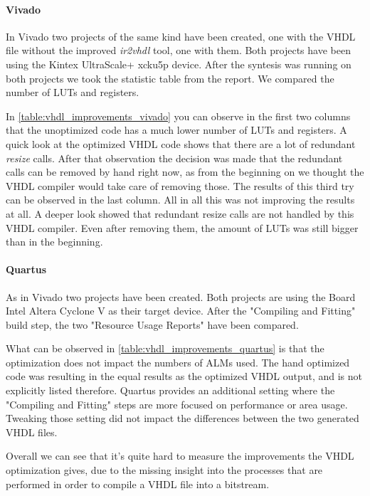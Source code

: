\paragraph{Vivado}
In Vivado two projects of the same kind have been created, one with the VHDL file without the improved \textit{ir2vhdl} tool, one with them. Both projects have been using the Kintex UltraScale+ xcku5p device. After the syntesis was running on both projects we took the statistic table from the report. We compared the number of LUTs and registers. 

In \autoref{table:vhdl_improvements_vivado} you can observe in the first two columns that the unoptimized code has a much lower number of LUTs and registers.
A quick look at the optimized VHDL code shows that there are a lot of redundant \textit{resize} calls. After that observation the decision was made that the redundant calls can be removed by hand right now, as from the beginning on we thought the VHDL compiler would take care of removing those. The results of this third try can be observed in the last column.
All in all this was not improving the results at all. A deeper look showed that redundant resize calls are not handled by this VHDL compiler. Even after removing them, the amount of LUTs was still bigger than in the beginning.

\paragraph{Quartus}
As in Vivado two projects have been created. Both projects are using the Board Intel Altera Cyclone V as their target device. After the "Compiling and Fitting" build step, the two "Resource Usage Reports" have been compared.

What can be observed in \autoref{table:vhdl_improvements_quartus} is that the optimization does not impact the numbers of ALMs used. The hand optimized code was resulting in the equal results as the optimized VHDL output, and is not explicitly listed therefore. Quartus provides an additional setting where the "Compiling and Fitting" steps are more focused on performance or area usage. Tweaking those setting did not impact the differences between the two generated VHDL files.

Overall we can see that it's quite hard to measure the improvements the VHDL optimization gives, due to the missing insight into the processes that are performed in order to compile a VHDL file into a bitstream.